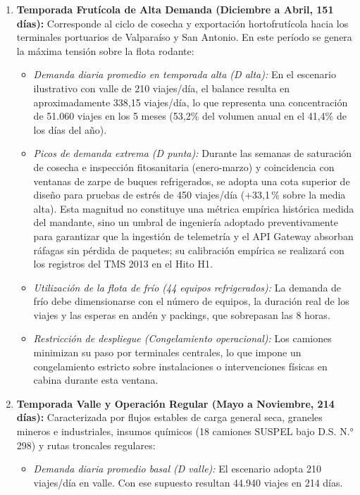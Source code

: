 \begin{enumerate}
  \item \textbf{Temporada Frutícola de Alta Demanda (Diciembre a Abril, 151 días):} Corresponde al ciclo de cosecha y exportación hortofrutícola hacia los terminales portuarios de Valparaíso y San Antonio. En este período se genera la máxima tensión sobre la flota rodante:
  \begin{itemize}
    \item \textit{Demanda diaria promedio en temporada alta (D alta):} En el escenario ilustrativo con valle de 210 viajes/día, el balance resulta en aproximadamente 338,15 viajes/día, lo que representa una concentración de 51.060 viajes en los 5 meses (53,2\% del volumen anual en el 41,4\% de los días del año).
    \item \textit{Picos de demanda extrema (D punta):} Durante las semanas de saturación de cosecha e inspección fitosanitaria (enero-marzo) y coincidencia con ventanas de zarpe de buques refrigerados, se adopta una cota superior de diseño para pruebas de estrés de 450 viajes/día (+33,1\,\% sobre la media alta). Esta magnitud no constituye una métrica empírica histórica medida del mandante, sino un umbral de ingeniería adoptado preventivamente para garantizar que la ingestión de telemetría y el API Gateway absorban ráfagas sin pérdida de paquetes; su calibración empírica se realizará con los registros del TMS 2013 en el Hito H1.
    \item \textit{Utilización de la flota de frío (44 equipos refrigerados):} La demanda de frío debe dimensionarse con el número de equipos, la duración real de los viajes y las esperas en andén y packings, que sobrepasan las 8 horas.
    \item \textit{Restricción de despliegue (Congelamiento operacional):} Los camiones minimizan su paso por terminales centrales, lo que impone un congelamiento estricto sobre instalaciones o intervenciones físicas en cabina durante esta ventana.
  \end{itemize}
  \item \textbf{Temporada Valle y Operación Regular (Mayo a Noviembre, 214 días):} Caracterizada por flujos estables de carga general seca, graneles mineros e industriales, insumos químicos (18 camiones SUSPEL bajo D.S. N.° 298) y rutas troncales regulares:
  \begin{itemize}
    \item \textit{Demanda diaria promedio basal (D valle):} El escenario adopta 210 viajes/día en valle. Con ese supuesto resultan 44.940 viajes en 214 días.

\end{itemize}
\end{enumerate}
